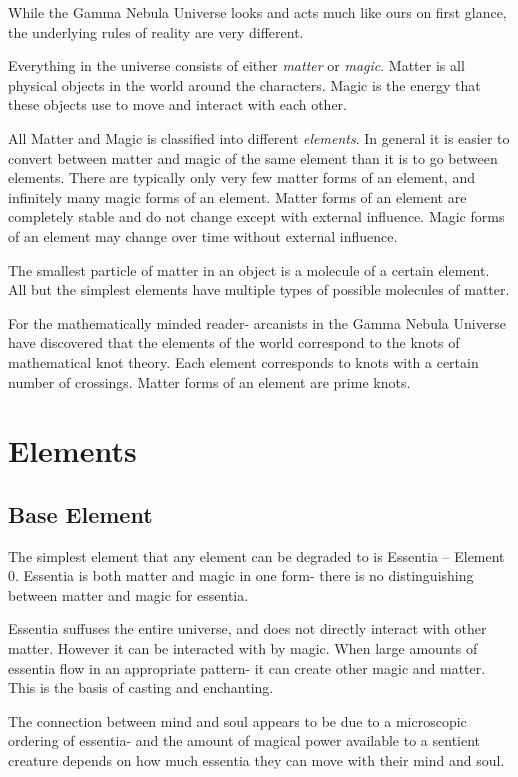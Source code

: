 
While the Gamma Nebula Universe looks and acts much like ours on first glance, the underlying rules of reality are very different.

Everything in the universe consists of either \emph{matter} or \emph{magic}. Matter is all physical objects in the world around the characters. Magic is the energy that these objects use to move and interact with each other.

All Matter and Magic is classified into different \emph{elements}. In general it is easier to convert between matter and magic of the same element than it is to go between elements. There are typically only very few matter forms of an element, and infinitely many magic forms of an element. Matter forms of an element are completely stable and do not change except with external influence. Magic forms of an element may change over time without external influence.

The smallest particle of matter in an object is a molecule of a certain element. All but the simplest elements have multiple types of possible molecules of matter.

For the mathematically minded reader- arcanists in the Gamma Nebula Universe have discovered that the elements of the world correspond to the knots of mathematical knot theory. Each element corresponds to knots with a certain number of crossings. Matter forms of an element are prime knots.

\section{Elements}

\subsection{Base Element}
The simplest element that any element can be degraded to is Essentia -- Element 0. Essentia is both matter and magic in one form- there is no distinguishing between matter and magic for essentia.

Essentia suffuses the entire universe, and does not directly interact with other matter. However it can be interacted with by magic. When large amounts of essentia flow in an appropriate pattern- it can create other magic and matter. This is the basis of casting and enchanting.

The connection between mind and soul appears to be due to a microscopic ordering of essentia- and the amount of magical power available to a sentient creature depends on how much essentia they can move with their mind and soul.

